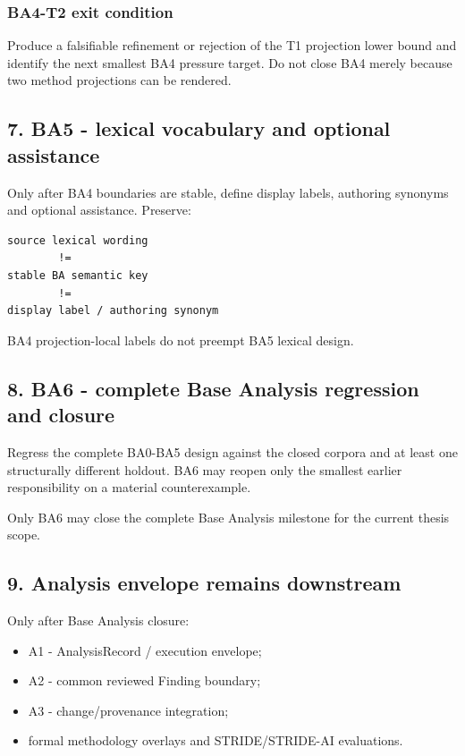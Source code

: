 \documentclass[11pt,a4paper]{article}
\providecommand{\tightlist}{\setlength{\itemsep}{0pt}\setlength{\parskip}{0pt}}
\begin{document}
\subsubsection{BA4-T2 exit condition}\label{ba4-t2-exit-condition}

Produce a falsifiable refinement or rejection of the T1 projection lower bound and identify the next smallest BA4 pressure target. Do not close BA4 merely because two method projections can be rendered.

\subsection{7. BA5 - lexical vocabulary and optional assistance}\label{7-ba5---lexical-vocabulary-and-optional-assistance}

Only after BA4 boundaries are stable, define display labels, authoring synonyms and optional assistance. Preserve:

\begin{verbatim}
source lexical wording
        !=
stable BA semantic key
        !=
display label / authoring synonym
\end{verbatim}

BA4 projection-local labels do not preempt BA5 lexical design.

\subsection{8. BA6 - complete Base Analysis regression and closure}\label{8-ba6---complete-base-analysis-regression-and-closure}

Regress the complete BA0-BA5 design against the closed corpora and at least one structurally different holdout. BA6 may reopen only the smallest earlier responsibility on a material counterexample.

Only BA6 may close the complete Base Analysis milestone for the current thesis scope.

\subsection{9. Analysis envelope remains downstream}\label{9-analysis-envelope-remains-downstream}

Only after Base Analysis closure:

\begin{itemize}
\tightlist
\item
  A1 - AnalysisRecord / execution envelope;
\item
  A2 - common reviewed Finding boundary;
\item
  A3 - change/provenance integration;
\item
  formal methodology overlays and STRIDE/STRIDE-AI evaluations.
\end{itemize}
\end{document}
